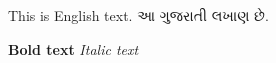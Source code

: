 \documentclass[12pt,a4paper]{article}
\begin{document}
This is English text. આ ગુજરાતી લખાણ છે.

\textbf{Bold text} \textit{Italic text}
\end{document}
